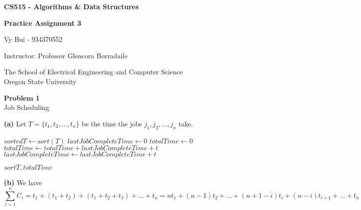 \documentclass[12pt,article]{article}
\newcommand\projnumber{3}
\newenvironment{problem}[2][Problem]
    { \begin{mdframed}[backgroundcolor=gray!20] \textbf{#1 #2} \\}
    {  \end{mdframed}}
\begin{document}
\begin{titlepage}
    \begin{center}
        \vspace*{4cm}

        \textbf{\Large CS515 - Algorithms \& Data Structures}

        \vspace{0.5cm}
 
        \textbf{\Large Practice Assignment \projnumber}
 
        \vspace{1cm}

        Vy Bui - 934370552

        \vspace{2cm}

        Instructor: Professor Glencora Borradaile
        \vfill
             
        \vspace{0.8cm}
      
             
        The School of Electrical Engineering and Computer Science\\
        Oregon State University\\
             
    \end{center}
\end{titlepage}

\begin{problem}{1} 
Job Scheduling
\end{problem}

\textbf{(a)}
Let $T = \{t_1, t_2, ..., t_n\}$ be the time the jobs $j_1, j_2, ..., j_n$ take.

\begin{algorithm}
\caption{$A(T)$}\label{alg:q1}
\begin{algorithmic}
    \State $sortedT \gets sort(T)$
    \State $lastJobCompleteTime \gets 0$
    \State $totalTime \gets 0$
        \State $totalTime \gets totalTime + lastJobCompleteTime + t$
        \State $lastJobCompleteTime \gets lastJobCompleteTime + t$
    \EndFor

    \Return $sortT, totalTime$
\end{algorithmic}
\end{algorithm}

\textbf{(b)}
We have 
$$\sum_{i=1}^{n} C_i = t_1 + (t_1 + t_2) + (t_1 + t_2 + t_3) + ... + t_n 
= nt_1 + (n-1)t_2 + ... + (n+1-i)t_i + (n-i)t_{i+1} + ... + t_n$$
\end{document}
